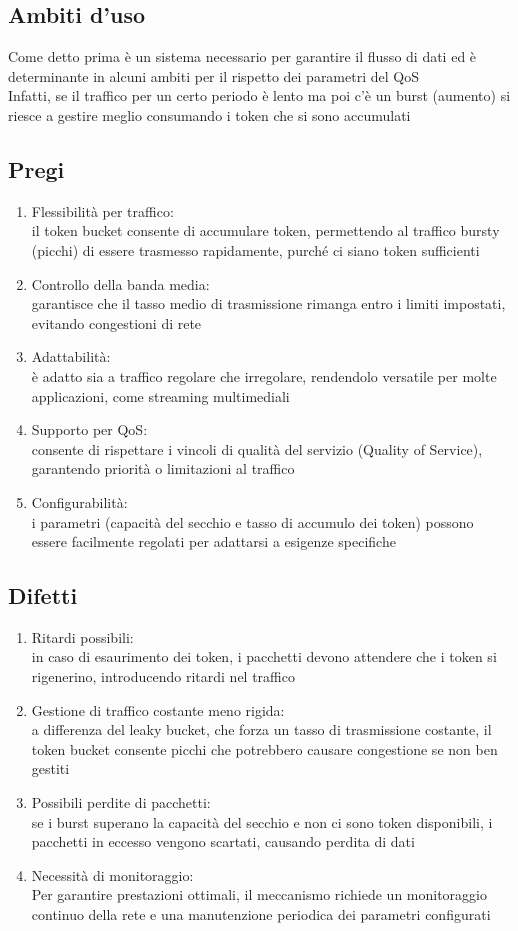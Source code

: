 \documentclass[10pt,oneside,a4paper]{article}
\begin{document}
\subsection{Ambiti d'uso}
Come detto prima è un sistema necessario per garantire il flusso di dati ed è determinante in alcuni ambiti per il rispetto dei parametri del QoS\\
Infatti, se il traffico per un certo periodo è lento ma poi c'è un burst (aumento) si riesce a gestire meglio consumando i token che si sono accumulati
\subsection{Pregi}
\begin{enumerate}
\item Flessibilità per traffico: \\
il token bucket consente di accumulare token, permettendo al traffico bursty (picchi) di essere trasmesso rapidamente, purché ci siano token sufficienti
\item Controllo della banda media:\\
garantisce che il tasso medio di trasmissione rimanga entro i limiti impostati, evitando congestioni di rete
\item Adattabilità:\\
è adatto sia a traffico regolare che irregolare, rendendolo versatile per molte applicazioni, come streaming multimediali
\item Supporto per QoS:\\
consente di rispettare i vincoli di qualità del servizio (Quality of Service), garantendo priorità o limitazioni al traffico
\item Configurabilità:\\
i parametri (capacità del secchio e tasso di accumulo dei token) possono essere facilmente regolati per adattarsi a esigenze specifiche
\end{enumerate}
\subsection{Difetti}
\begin{enumerate}
\item Ritardi possibili:\\
in caso di esaurimento dei token, i pacchetti devono attendere che i token si rigenerino, introducendo ritardi nel traffico
\item Gestione di traffico costante meno rigida:\\
a differenza del leaky bucket, che forza un tasso di trasmissione costante, il token bucket consente picchi che potrebbero causare congestione se non ben gestiti
\item Possibili perdite di pacchetti:\\
se i burst superano la capacità del secchio e non ci sono token disponibili, i pacchetti in eccesso vengono scartati, causando perdita di dati
\item Necessità di monitoraggio:\\
Per garantire prestazioni ottimali, il meccanismo richiede un monitoraggio continuo della rete e una manutenzione periodica dei parametri configurati
\end{enumerate}
\end{document}
